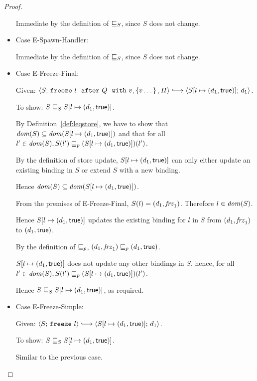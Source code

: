 \begin{proof}
\begin{itemize}
      Immediate by the definition of $ \sqsubseteq_S $, since $S$ does
      not change.

    \item Case {\sc E-Spawn-Handler}:

      Immediate by the definition of $ \sqsubseteq_S $, since $S$ does
      not change.

    \item Case {\sc E-Freeze-Final}:

      Given: $\config{S}{\freezeafterfull{l}{Q}{v}{\setof{v\dots}}{H}}
      \parstepsto \config{\extS{S}{l}{d_1}{\frozentrue}}{d_1}$.

      To show: $S \sqsubseteq_S S[l \mapsto (d_1, \textsf{true})]$.

      By Definition~\ref{def:leqstore}, we have to show that $\mathit{dom}(S)
      \subseteq \mathit{dom}(S[l \mapsto (d_1, \textsf{true})])$ and that for all
      $l' \in \mathit{dom}(S), \\
      S(l') \sqsubseteq_p (S[l \mapsto (d_1, \textsf{true})])(l')$.


      By the definition of store update,
      $S[l \mapsto (d_1, \textsf{true})]$ can only either update an
      existing binding in $S$ or extend $S$ with a new binding.

      Hence $\mathit{dom}(S) \subseteq \mathit{dom}(S[l \mapsto (d_1, \textsf{true})])$.

      From the premises of {\sc E-Freeze-Final}, $S(l) =
      (d_1, \mathit{frz}_1)$.  Therefore $l \in \mathit{dom}(S)$.

      Hence $S[l \mapsto (d_1, \textsf{true})]$ updates the existing
      binding for $l$ in $S$ from $(d_1, \mathit{frz}_1)$ to
      $(d_1, \textsf{true})$.

      By the definition of $\sqsubseteq_p$, $(d_1, \mathit{frz}_1) \sqsubseteq_p
      (d_1, \textsf{true})$.

      $S[l \mapsto (d_1, \textsf{true})]$ does not update any other
      bindings in $S$, hence, for all $l' \in \mathit{dom}(S), \\
      S(l') \sqsubseteq_p (S[l \mapsto (d_1, \textsf{true})])(l')$.

      Hence $S \sqsubseteq_S S[l \mapsto (d_1, \textsf{true})]$, as
      required.

    \item Case {\sc E-Freeze-Simple}:

      Given: $\config{S}{\freeze{l}} \parstepsto
      \config{\extS{S}{l}{d_1}{\frozentrue}}{d_1}$.

      To show: $S \sqsubseteq_S S[l \mapsto (d_1, \textsf{true})]$.

      Similar to the previous case.

  \end{itemize}

\end{proof}
